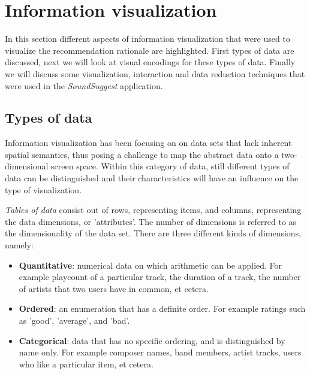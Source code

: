 % 
\section{Information visualization}\label{chapter:literature_study:section:interaction}


In this section different aspects of information visualization that were used to visualize the recommendation rationale are highlighted. First types of data are discussed, next we will look at visual encodings for these types of data. Finally we will discuss some visualization, interaction and data reduction techniques that were used in the \emph{SoundSuggest} application.


\subsection{Types of data}\label{chapter:literature_study:section:interaction:subsection:datatypes}


Information visualization has been focusing on on data sets that lack inherent spatial semantics, thus posing a challenge to map the abstract data onto a two-dimensional screen space\cite{keim:2002}. Within this category of data, still different types of data can be distinguished and their characteristics will have an influence on the type of visualization.

\emph{Tables of data} consist out of rows, representing items, and columns, representing the data dimensions, or 'attributes'. The number of dimensions is referred to as the dimensionality of the data set\cite{keim:2002}. There are three different kinds of dimensions, namely\cite{shirley:2009}:

\begin{itemize}
	\item \textbf{Quantitative}: numerical data on which arithmetic can be applied. For example playcount of a particular track, the duration of a track, the number of artists that two users have in common, et cetera.
	\item \textbf{Ordered}: an enumeration that has a definite order. For example ratings such as 'good', 'average', and 'bad'.
	\item \textbf{Categorical}: data that has no specific ordering, and is distinguished by name only. For example composer names, band members, artist tracks, users who like a particular item, et cetera.
\end{itemize}

